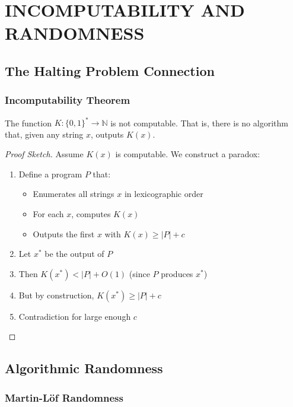 \documentclass[12pt,a4paper]{report}
\begin{document}
\chapter{INCOMPUTABILITY AND RANDOMNESS}

\section{The Halting Problem Connection}

\subsection{Incomputability Theorem}

\begin{theorem}
The function $K: \{0,1\}^* \rightarrow \mathbb{N}$ is not computable. That is, there is no algorithm that, given any string $x$, outputs $K(x)$.
\end{theorem}

\begin{proof}[Proof Sketch]
Assume $K(x)$ is computable. We construct a paradox:

\begin{enumerate}
    \item Define a program $P$ that:
    \begin{itemize}
        \item Enumerates all strings $x$ in lexicographic order
        \item For each $x$, computes $K(x)$
        \item Outputs the first $x$ with $K(x) \geq |P| + c$
    \end{itemize}
    \item Let $x^*$ be the output of $P$
    \item Then $K(x^*) < |P| + O(1)$ (since $P$ produces $x^*$)
    \item But by construction, $K(x^*) \geq |P| + c$
    \item Contradiction for large enough $c$
\end{enumerate}
\end{proof}

\section{Algorithmic Randomness}

\subsection{Martin-Löf Randomness}
\end{document}
